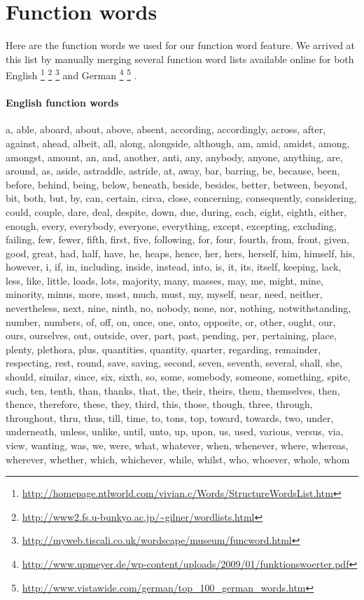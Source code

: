 
\section{Function words}
\label{sec:app_function_words}
Here are the function words we used for our function word feature. We arrived at this list by manually merging several function word lists available online for both English
\footnote{\url{http://homepage.ntlworld.com/vivian.c/Words/StructureWordsList.htm}}
\footnote{\url{http://www2.fs.u-bunkyo.ac.jp/~gilner/wordlists.html}}
\footnote{\url{http://myweb.tiscali.co.uk/wordscape/museum/funcword.html}}
and German
\footnote{\url{http://www.upmeyer.de/wp-content/uploads/2009/01/funktionswoerter.pdf}}
\footnote{\url{http://www.vistawide.com/german/top_100_german_words.htm}}
.


\paragraph{English function words}
a, able, aboard, about, above, absent, according, accordingly, across, after, against, ahead, albeit, all, along, alongside, although, am, amid, amidst, among, amongst, amount, an, and, another, anti, any, anybody, anyone, anything, are, around, as, aside, astraddle, astride, at, away, bar, barring, be, because, been, before, behind, being, below, beneath, beside, besides, better, between, beyond, bit, both, but, by, can, certain, circa, close, concerning, consequently, considering, could, couple, dare, deal, despite, down, due, during, each, eight, eighth, either, enough, every, everybody, everyone, everything, except, excepting, excluding, failing, few, fewer, fifth, first, five, following, for, four, fourth, from, front, given, good, great, had, half, have, he, heaps, hence, her, hers, herself, him, himself, his, however, i, if, in, including, inside, instead, into, is, it, its, itself, keeping, lack, less, like, little, loads, lots, majority, many, masses, may, me, might, mine, minority, minus, more, most, much, must, my, myself, near, need, neither, nevertheless, next, nine, ninth, no, nobody, none, nor, nothing, notwithstanding, number, numbers, of, off, on, once, one, onto, opposite, or, other, ought, our, ours, ourselves, out, outside, over, part, past, pending, per, pertaining, place, plenty, plethora, plus, quantities, quantity, quarter, regarding, remainder, respecting, rest, round, save, saving, second, seven, seventh, several, shall, she, should, similar, since, six, sixth, so, some, somebody, someone, something, spite, such, ten, tenth, than, thanks, that, the, their, theirs, them, themselves, then, thence, therefore, these, they, third, this, those, though, three, through, throughout, thru, thus, till, time, to, tons, top, toward, towards, two, under, underneath, unless, unlike, until, unto, up, upon, us, used, various, versus, via, view, wanting, was, we, were, what, whatever, when, whenever, where, whereas, wherever, whether, which, whichever, while, whilst, who, whoever, whole, whom


